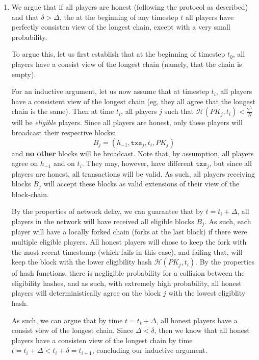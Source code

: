 \documentclass[12pt]{exam}
\newcommand{\Q}[1]{\question{\large{\textbf{#1}}}}
\begin{document}
\begin{questions}
\newpage
\Q{Problem 5}
\begin{solution}
  \begin{enumerate}[label=\textbf{\alph*.}]
    \item
      We argue that if all players are honest (following the protocol as described) and that $\delta > \Delta$, the at the beginning of any timestep $t$ all players have perfectly consisten view of the longest chain, except with a very small probability.

      To argue this, let us first establish that at the beginning of timestep $t_0$, all players have a consist view of the longest chain (namely, that the chain is empty).

      For an inductive argument, let us now assume that at timestep $t_i$, all players have a consistent view of the longest chain (eg, they all agree that the longest chain is the same). Then at time $t_i$, all players $j$ such that $\mathcal{H}(PK_j, t_i) < \frac{2^{\lambda}}{N}$ will be \textit{eligible} players. Since all players are honest, only these players will broadcast their respective blocks:
      \[
        B_j = (h_{-1}, \texttt{txs}_j, t_i, PK_j)
      \]
      and \textbf{no other} blocks will be broadcast. Note that, by assumption, all players agree on $h_{-1}$ and on $t_i$. They may, however, have different $\texttt{txs}_j$, but since all players are honest, all transactions will be valid. As such, all players receiving blocks $B_j$ will accept these blocks as valid extensions of their view of the block-chain.

      By the properties of network delay, we can guarantee that by $t = t_i + \Delta$, all players in the network will have received all eligible blocks $B_j$. As such, each player will have a locally forked chain (forks at the last block) if there were multiple eligible players. All honest players will chose to keep the fork with the most recent timestamp (which fails in this case), and failing that, will keep the block with the lower eligibility hash $\mathcal{H}(PK_j, t_i)$. By the properties of hash functions, there is negligible probability for a collision between the eligibility hashes, and as such, with extremely high probability, all honest players will deterministically agree on the block $j$ with the lowest eligiblity hash.

      As such, we can argue that by time $t = t_i + \Delta$, all honest players have a consist view of the longest chain. Since $\Delta < \delta$, then we know that all honest players have a consisten view of the longest chain by time $t = t_i + \Delta < t_i + \delta = t_{i+1}$, concluding our inductive argument.


\end{enumerate}
\end{solution}
\end{questions}
\end{document}
